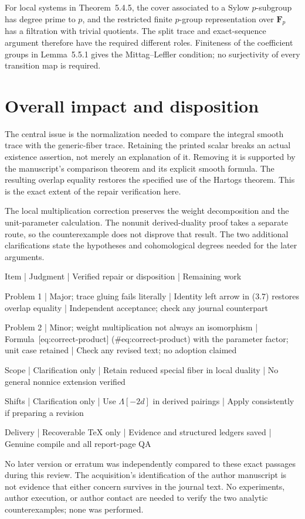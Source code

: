 \documentclass[10pt]{article}
\begin{document}
For local systems in Theorem 5.4.5, the cover associated to a Sylow \(p\)-subgroup has degree prime to \(p\), and the restricted finite \(p\)-group representation over \(\mathbf F_p\) has a filtration with trivial quotients. The split trace and exact-sequence argument therefore have the required different roles. Finiteness of the coefficient groups in Lemma 5.5.1 gives the Mittag–Leffler condition; no surjectivity of every transition map is required.\par
\section*{Overall impact and disposition}
The central issue is the normalization needed to compare the integral smooth trace with the generic-fiber trace. Retaining the printed scalar breaks an actual existence assertion, not merely an explanation of it. Removing it is supported by the manuscript’s comparison theorem and its explicit smooth formula. The resulting overlap equality restores the specified use of the Hartogs theorem. This is the exact extent of the repair verification here.\par
The local multiplication correction preserves the weight decomposition and the unit-parameter calculation. The nonunit derived-duality proof takes a separate route, so the counterexample does not disprove that result. The two additional clarifications state the hypotheses and cohomological degrees needed for the later arguments.\par
Item | Judgment | Verified repair or disposition | Remaining work\par
Problem 1 | Major; trace gluing fails literally | Identity left arrow in (3.7) restores overlap equality | Independent acceptance; check any journal counterpart\par
Problem 2 | Minor; weight multiplication not always an isomorphism | Formula [eq:correct-product] (\#eq:correct-product) with the parameter factor; unit case retained | Check any revised text; no adoption claimed\par
Scope | Clarification only | Retain reduced special fiber in local duality | No general nonnice extension verified\par
Shifts | Clarification only | Use \(\Lambda[-2d]\) in derived pairings | Apply consistently if preparing a revision\par
Delivery | Recoverable TeX only | Evidence and structured ledgers saved | Genuine compile and all report-page QA\par
No later version or erratum was independently compared to these exact passages during this review. The acquisition’s identification of the author manuscript is not evidence that either concern survives in the journal text. No experiments, author execution, or author contact are needed to verify the two analytic counterexamples; none was performed.\par
\end{document}
